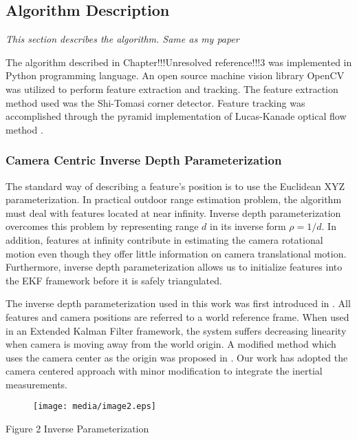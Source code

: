 \subsection{Algorithm Description}\label{section:_Toc332876129}
\textit{This section describes the algorithm. Same as my paper}

The algorithm described in Chapter!!!Unresolved reference!!!3 was 
implemented in Python programming language. An open source machine 
vision library OpenCV was utilized to perform feature extraction and 
tracking. The feature extraction method used was the Shi-Tomasi corner 
detector. Feature tracking was accomplished through the pyramid 
implementation of Lucas-Kanade optical flow method . 

\subsubsection{Camera Centric Inverse Depth 
Parameterization}\label{section:_Toc332876130}
The standard way of describing a feature's position is to use the 
Euclidean XYZ parameterization. In practical outdoor range estimation 
problem, the algorithm must deal with features located at near infinity. 
Inverse depth parameterization overcomes this problem by representing 
range $d$ in its inverse form $\rho =1/d$. In addition, features at 
infinity contribute in estimating the camera rotational motion even 
though they offer little information on camera translational motion. 
Furthermore, inverse depth parameterization allows us to initialize 
features into the EKF framework before it is safely triangulated.

The inverse depth parameterization used in this work was first 
introduced in . All features and camera positions are referred to a 
world reference frame. When used in an Extended Kalman Filter framework, 
the system suffers decreasing linearity when camera is moving away from 
the world origin. A modified method which uses the camera center as the 
origin was proposed in . Our work has adopted the camera centered 
approach with minor modification to integrate the inertial measurements.

\begin{figure}[h]
\centering
\texttt{[image: media/image2.eps]}
\end{figure}


\begin{center}Figure 2 Inverse Parameterization\end{center}

